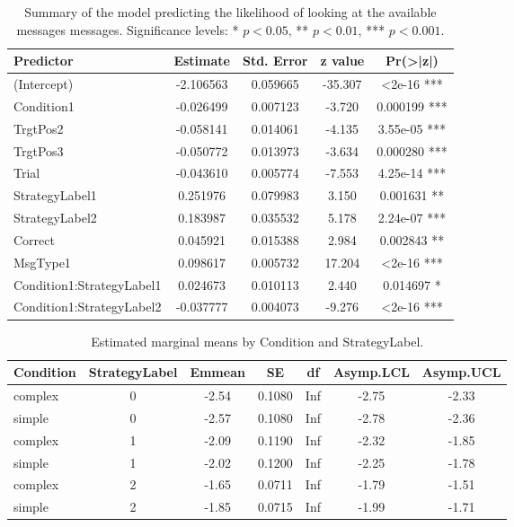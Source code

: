 \begin{table}[h!]
\centering
\begin{tabular}{lcccc}
\hline
\textbf{Predictor} & \textbf{Estimate} & \textbf{Std. Error} & \textbf{z value} & \textbf{Pr(>|z|)} \\
\hline
(Intercept)                & -2.106563 & 0.059665 & -35.307 & <2e-16 *** \\
Condition1                 & -0.026499 & 0.007123 &  -3.720 & 0.000199 *** \\
TrgtPos2                   & -0.058141 & 0.014061 &  -4.135 & 3.55e-05 *** \\
TrgtPos3                   & -0.050772 & 0.013973 &  -3.634 & 0.000280 *** \\
Trial                      & -0.043610 & 0.005774 &  -7.553 & 4.25e-14 *** \\
StrategyLabel1             &  0.251976 & 0.079983 &   3.150 & 0.001631 **  \\
StrategyLabel2             &  0.183987 & 0.035532 &   5.178 & 2.24e-07 *** \\
Correct                    &  0.045921 & 0.015388 &   2.984 & 0.002843 **  \\
MsgType1                   &  0.098617 & 0.005732 &  17.204 & <2e-16 *** \\
Condition1:StrategyLabel1  &  0.024673 & 0.010113 &   2.440 & 0.014697 *   \\
Condition1:StrategyLabel2  & -0.037777 & 0.004073 &  -9.276 & <2e-16 *** \\
\hline
\end{tabular}
\caption{Summary of the model predicting the likelihood of looking at the available messages messages. 
Significance levels: * $p < 0.05$, ** $p < 0.01$, *** $p < 0.001$.}
\label{tab:av_msgs_strtg}
\end{table}



\begin{table}[h!]
\centering
\begin{tabular}{lcccccc}
\hline
\textbf{Condition} & \textbf{StrategyLabel} & \textbf{Emmean} & \textbf{SE} & \textbf{df} & \textbf{Asymp.LCL} & \textbf{Asymp.UCL} \\
\hline
complex & 0 & -2.54 & 0.1080 & Inf & -2.75 & -2.33 \\
simple  & 0 & -2.57 & 0.1080 & Inf & -2.78 & -2.36 \\
complex & 1 & -2.09 & 0.1190 & Inf & -2.32 & -1.85 \\
simple  & 1 & -2.02 & 0.1200 & Inf & -2.25 & -1.78 \\
complex & 2 & -1.65 & 0.0711 & Inf & -1.79 & -1.51 \\
simple  & 2 & -1.85 & 0.0715 & Inf & -1.99 & -1.71 \\
\hline
\end{tabular}
\caption{Estimated marginal means by Condition and StrategyLabel.}
\label{tab:av_msgs_strtg_cond}
\end{table}

